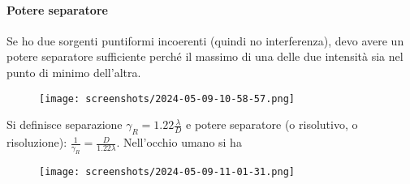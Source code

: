 \paragraph{Potere separatore}
Se ho due sorgenti puntiformi incoerenti (quindi no interferenza), devo avere un potere separatore sufficiente perché il massimo di una delle due intensità sia nel punto di minimo dell'altra.
\begin{figure}[H]
	\centering
	\texttt{[image: screenshots/2024-05-09-10-58-57.png]}
\end{figure}
Si definisce separazione \(\gamma _R = 1.22 \frac{\lambda }{D}\) e potere separatore (o risolutivo, o risoluzione): \(\frac{1}{\gamma _R} = \frac{D}{1.22 \lambda }\). Nell'occhio umano si ha
\begin{figure}[H]
	\centering
	\texttt{[image: screenshots/2024-05-09-11-01-31.png]}
\end{figure}